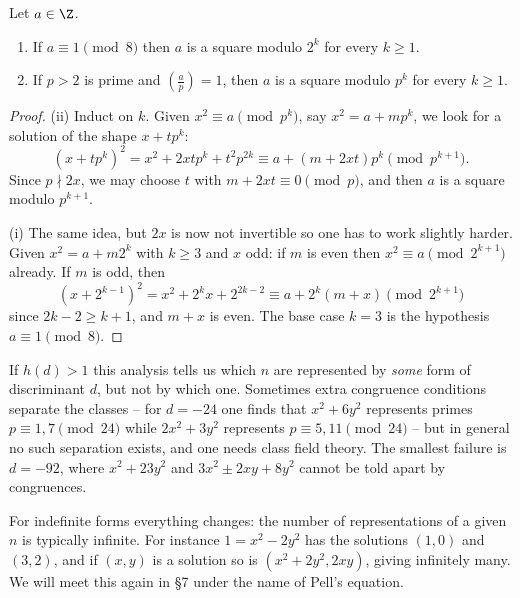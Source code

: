 \begin{lemma}\label{nt-lem:lifting}
	Let $a \in \Z$.
	\begin{enumerate}[label=(\roman*)]
		\item If $a \equiv 1 \pmod 8$ then $a$ is a square modulo $2^k$ for every $k \geq 1$.
		\item If $p > 2$ is prime and $\left( \frac ap \right) = 1$, then $a$ is a square modulo $p^k$ for every $k \geq 1$.
	\end{enumerate}
\end{lemma}
\begin{proof}
	(ii) Induct on $k$. Given $x^2 \equiv a \pmod{p^k}$, say $x^2 = a + mp^k$, we look for a solution of the shape $x + tp^k$:
	$$
	(x + tp^k)^2 = x^2 + 2xtp^k + t^2p^{2k} \equiv a + (m + 2xt)p^k \pmod{p^{k+1}}.
	$$
	Since $p \nmid 2x$, we may choose $t$ with $m + 2xt \equiv 0 \pmod p$, and then $a$ is a square modulo $p^{k+1}$.

	(i) The same idea, but $2x$ is now not invertible so one has to work slightly harder. Given $x^2 = a + m2^k$ with $k \geq 3$ and $x$ odd: if $m$ is even then $x^2 \equiv a \pmod{2^{k+1}}$ already. If $m$ is odd, then
	$$
	(x + 2^{k-1})^2 = x^2 + 2^kx + 2^{2k - 2} \equiv a + 2^k(m + x) \pmod{2^{k+1}}
	$$
	since $2k - 2 \geq k+1$, and $m + x$ is even. The base case $k = 3$ is the hypothesis $a \equiv 1 \pmod 8$.
\end{proof}

\begin{remark}
	If $h(d) > 1$ this analysis tells us which $n$ are represented by \emph{some} form of discriminant $d$, but not by which one. Sometimes extra congruence conditions separate the classes -- for $d = -24$ one finds that $x^2 + 6y^2$ represents primes $p \equiv 1, 7 \pmod{24}$ while $2x^2 + 3y^2$ represents $p \equiv 5, 11 \pmod{24}$ -- but in general no such separation exists, and one needs class field theory. The smallest failure is $d = -92$, where $x^2 + 23y^2$ and $3x^2 \pm 2xy + 8y^2$ cannot be told apart by congruences.
\end{remark}

\begin{remark}
	For indefinite forms everything changes: the number of representations of a given $n$ is typically infinite. For instance $1 = x^2 - 2y^2$ has the solutions $(1,0)$ and $(3,2)$, and if $(x,y)$ is a solution so is $(x^2 + 2y^2, 2xy)$, giving infinitely many. We will meet this again in \S7 under the name of Pell's equation.
\end{remark}

